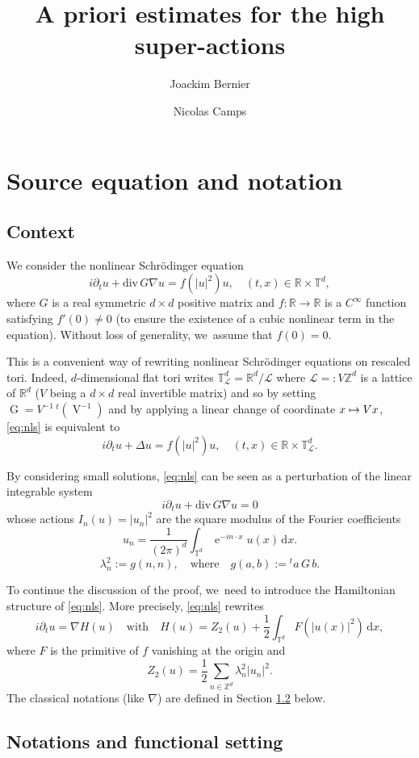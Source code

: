 \documentclass[10pt]{amsart}
\let\Subsection\subsection
\newcommand\mto{\mathchoice{\longmapsto}{\mapsto}{\mapsto}{\mapsto}}
\theoremstyle{plain}
\theoremstyle{definition}
\DeclareMathOperator{\e}{e}
\newcommand{\R}{\mathbb{R}}
\newcommand{\T}{\mathbb{T}}
\newcommand{\1}{\mathbf{1}}
\begin{document}
\title{A priori estimates for the high super-actions}
\author{Joackim Bernier \and Nicolas Camps}
\maketitle
\section{Source equation and notation}
\subsection{Context}
We consider the nonlinear Schrödinger equation
\begin{equation}
\label{eq:nls}
\tag{NLS}
i\partial_{t}u + \mathrm{div} \, G \nabla u = f(|u|^{2})u,\quad (t,x)\in\R\times\mathbb{T}^{d},
\end{equation}
where $G$ is a real symmetric $d\times d$ positive matrix and $f:\R\to\R$ is a $C^\infty$ function satisfying $f'(0)\neq 0$ (to ensure the existence of a cubic nonlinear term in the equation). Without loss of generality, we~assume that $f(0)=0$.

This is a convenient way of rewriting nonlinear Schrödinger equations on rescaled tori. Indeed, $d$-dimensional flat tori writes $\mathbb{T}_{\mathscr{L}}^d= \R^d/\mathscr{L}$ where $\mathscr{L}=: V \mathbb{Z}^d$ is a lattice of $\R^d$ ($V$ being a $d\times d$ real invertible matrix) and so by setting $\operatorname{G} = V^{-1} \, ^{t}(\operatorname{V}^{-1})$ and by applying a linear change of coordinate $x\mto Vx$, \eqref{eq:nls} is equivalent to
\begin{equation*}
i\partial_tu + \Delta u = f(|u|^2)u,\quad (t,x)\in \R\times\T_{\mathscr{L}}^d.
\end{equation*}

By considering small solutions, \eqref{eq:nls} can be seen as a perturbation of the linear integrable system
\begin{equation}
\label{eq:Schrolin}
i\partial_{t}u + \mathrm{div} \, G \nabla u = 0
\end{equation}
whose actions $I_n(u) = |u_n|^2$ are the square modulus of the Fourier coefficients
\[
u_{n} = \frac{1}{(2\pi)^d}\int_{\T^{d}}\e^{-in\cdot x}u(x)\, \mathrm{d}x.
\]
\[
\lambda_n^2:= g(n,n), \quad \mathrm{where} \quad g(a,b):={} ^t\!a\,G\, b.
\]

To continue the discussion of the proof, we~need to introduce the Hamiltonian structure of \eqref{eq:nls}. More precisely, \eqref{eq:nls} rewrites
\begin{equation}
\label{eq:hamNLS}
i\partial_t u = \nabla H(u) \quad \mathrm{with} \quad H(u) = Z_2(u)+ \frac12 \int_{\mathbb{T}^d} F(|u(x)|^2) \, \mathrm{d}x,
\end{equation}
where $F$ is the primitive of $f$ vanishing at the origin and
\[
Z_2(u) = \frac12 \sum_{n\in \mathbb{Z}^d} \lambda_n^2 |u_n|^2.
\]
The classical notations (like $\nabla$) are defined in Section \ref{sec:notations} below.
\setcounter{subsection}{3}
\Subsection{Notations and functional setting}
\label{sec:notations}
\end{document}
